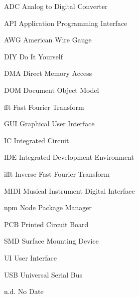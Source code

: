 \begin{acronyms}
  \item[ADC] Analog to Digital Converter
  \item[API] Application Programming Interface
  \item[AWG] American Wire Gauge
  \item[DIY] Do It Yourself
  \item[DMA] Direct Memory Access
  \item[DOM] Document Object Model
  \item[fft] Fast Fourier Transform
  \item[GUI] Graphical User Interface
  \item[IC] Integrated Circuit
  \item[IDE] Integrated Development Environment
  \item[ifft] Inverse Fast Fourier Transform
  \item[MIDI] Musical Instrument Digital Interface
  \item[npm] Node Package Manager
  \item[PCB] Printed Circuit Board
  \item[SMD] Surface Mounting Device
  \item[UI] User Interface
  \item[USB] Universal Serial Bus
  \item[n.d.] No Date
\end{acronyms}
